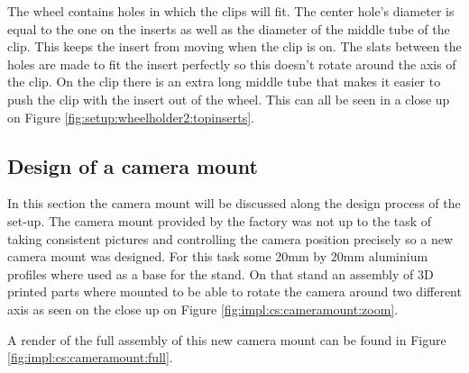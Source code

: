 		The wheel contains holes in which the clips will fit. The center hole's diameter is equal to the one on the inserts as well as the diameter of the middle tube of the clip. This keeps the insert from moving when the clip is on. The slats between the holes are made to fit the insert perfectly so this doesn't rotate around the axis of the clip. On the clip there is an extra long middle tube that makes it easier to push the clip with the insert out of the wheel. This can all be seen in a close up on Figure \ref{fig:setup:wheelholder2:topinserts}.
		
	\subsection{Design of a camera mount}
	\label{sec:impl:camerasetup:cameramount} 
	In this section the camera mount will be discussed along the design process of the set-up.
		The camera mount provided by the factory was not up to the task of taking consistent pictures and controlling the camera position precisely so a new camera mount was designed. For this task some 20mm by 20mm aluminium profiles where used as a base for the stand. On that stand an assembly of 3D printed parts where mounted to be able to rotate the camera around two different axis as seen on the close up on Figure \ref{fig:impl:cs:cameramount:zoom}. 
		
		A render of the full assembly of this new camera mount can be found in Figure \ref{fig:impl:cs:cameramount:full}.
		
